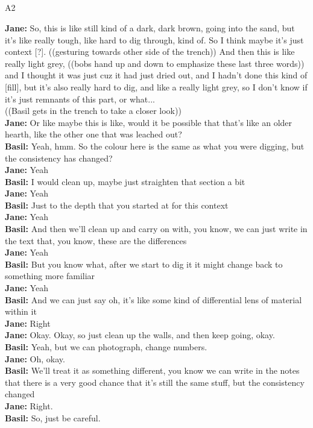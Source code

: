 \documentclass[
]{article}
\makeatletter
\let\oldsubparagraph\subparagraph
\renewcommand{\subparagraph}{
    \@ifstar
      \xxxSubParagraphStar
      \xxxSubParagraphNoStar
  }
\newcommand{\xxxSubParagraphStar}[1]{\oldsubparagraph*{#1}\mbox{}}
\newcommand{\xxxSubParagraphNoStar}[1]{\oldsubparagraph{#1}\mbox{}}
\makeatother
\begin{document}
\subparagraph{A2}\label{sec-A2}

\textbf{Jane:} So, this is like still kind of a dark, dark brown, going
into the sand, but it's like really tough, like hard to dig through,
kind of. So I think maybe it's just context {[}?{]}. ((gesturing towards
other side of the trench)) And then this is like really light grey,
((bobs hand up and down to emphasize these last three words)) and I
thought it was just cuz it had just dried out, and I hadn't done this
kind of {[}fill{]}, but it's also really hard to dig, and like a really
light grey, so I don't know if it's just remnants of this part, or
what...\\
((Basil gets in the trench to take a closer look))\\
\textbf{Jane:} Or like maybe this is like, would it be possible that
that's like an older hearth, like the other one that was leached out?\\
\textbf{Basil:} Yeah, hmm. So the colour here is the same as what you
were digging, but the consistency has changed?\\
\textbf{Jane:} Yeah\\
\textbf{Basil:} I would clean up, maybe just straighten that section a
bit\\
\textbf{Jane:} Yeah\\
\textbf{Basil:} Just to the depth that you started at for this context\\
\textbf{Jane:} Yeah\\
\textbf{Basil:} And then we'll clean up and carry on with, you know, we
can just write in the text that, you know, these are the differences\\
\textbf{Jane:} Yeah\\
\textbf{Basil:} But you know what, after we start to dig it it might
change back to something more familiar\\
\textbf{Jane:} Yeah\\
\textbf{Basil:} And we can just say oh, it's like some kind of
differential lens of material within it\\
\textbf{Jane:} Right\\
\textbf{Jane:} Okay. Okay, so just clean up the walls, and then keep
going, okay.\\
\textbf{Basil:} Yeah, but we can photograph, change numbers.\\
\textbf{Jane:} Oh, okay.\\
\textbf{Basil:} We'll treat it as something different, you know we can
write in the notes that there is a very good chance that it's still the
same stuff, but the consistency changed\\
\textbf{Jane:} Right.\\
\textbf{Basil:} So, just be careful.
\end{document}
